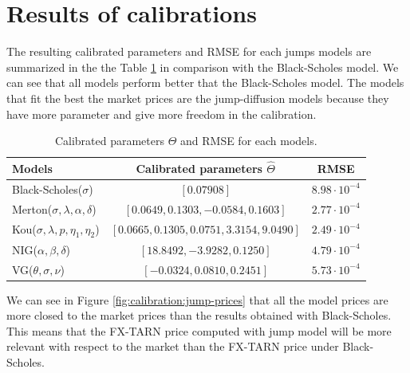 \section{Results of calibrations}
\label{sec:calibration:results}
The resulting calibrated parameters and RMSE for each jumps models are summarized in the the Table \ref{tab:param} in comparison with the Black-Scholes model. We can see that all models perform better that the Black-Scholes model. The models that fit the best the market prices are the jump-diffusion models because they have more parameter and give more freedom in the calibration.
\begin{table}[!ht]
\centering
  \begin{tabular}{l|c|c}
    \toprule
    Models & Calibrated parameters $\hat{\Theta}$ & RMSE \\
    \toprule
   Black-Scholes($\sigma$) & $[0.07908]$ & $8.98\cdot 10^{-4}$ \\
   \midrule
   Merton($\sigma,\lambda,\alpha,\delta$)  & $[0.0649,0.1303,-0.0584,0.1603]$ & $2.77\cdot 10^{-4}$\\
   Kou($\sigma,\lambda,p,\eta_1,\eta_2$) & $[0.0665,0.1305,0.0751,3.3154,9.0490]$&$2.49 \cdot 10^{-4}$ \\
   \midrule
   NIG($\alpha,\beta,\delta$) & $[18.8492,-3.9282,0.1250]$&$4.79\cdot 10^{-4}$\\
   VG($\theta, \sigma,\nu$) & $[-0.0324,0.0810,0.2451]$&$5.73\cdot 10^{-4}$\\
    \bottomrule
  \end{tabular}
  \vspace{5pt}
  \caption{\label{tab:param} Calibrated parameters $\hat{\Theta}$ and RMSE for each models.}
\end{table}
\newpage
We can see in Figure \ref{fig:calibration:jump-prices} that all the model prices are more closed to the market prices than the results obtained with Black-Scholes. This means that the FX-TARN price computed with jump model will be more relevant with respect to the market than the FX-TARN price under Black-Scholes.

